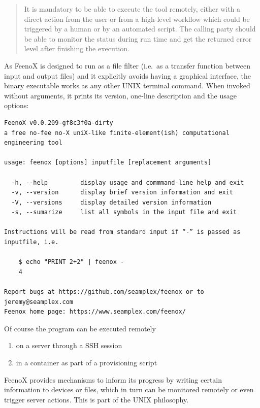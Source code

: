\documentclass[
  american,
]{article}
\providecommand{\tightlist}{%
  \setlength{\itemsep}{0pt}\setlength{\parskip}{0pt}}
\begin{document}
\begin{quote}
It is mandatory to be able to execute the tool remotely, either with a
direct action from the user or from a high-level workflow which could be
triggered by a human or by an automated script. The calling party should
be able to monitor the status during run time and get the returned error
level after finishing the execution.
\end{quote}

As FeenoX is designed to run as a file filter (i.e.~as a transfer
function between input and output files) and it explicitly avoids having
a graphical interface, the binary executable works as any other UNIX
terminal command. When invoked without arguments, it prints its version,
one-line description and the usage options:

\begin{lstlisting}[stye=terminal]
FeenoX v0.0.209-gf8c3f0a-dirty 
a free no-fee no-X uniX-like finite-element(ish) computational engineering tool

usage: feenox [options] inputfile [replacement arguments]

  -h, --help         display usage and commmand-line help and exit
  -v, --version      display brief version information and exit
  -V, --versions     display detailed version information
  -s, --sumarize     list all symbols in the input file and exit

Instructions will be read from standard input if “-” is passed as
inputfile, i.e.

    $ echo "PRINT 2+2" | feenox -
    4

Report bugs at https://github.com/seamplex/feenox or to jeremy@seamplex.com
Feenox home page: https://www.seamplex.com/feenox/
\end{lstlisting}

Of course the program can be executed remotely

\begin{enumerate}
\def\labelenumi{\arabic{enumi}.}
\tightlist
\item
  on a server through a SSH session
\item
  in a container as part of a provisioning script
\end{enumerate}

FeenoX provides mechanisms to inform its progress by writing certain
information to devices or files, which in turn can be monitored remotely
or even trigger server actions. This is part of the UNIX philosophy.
\end{document}

